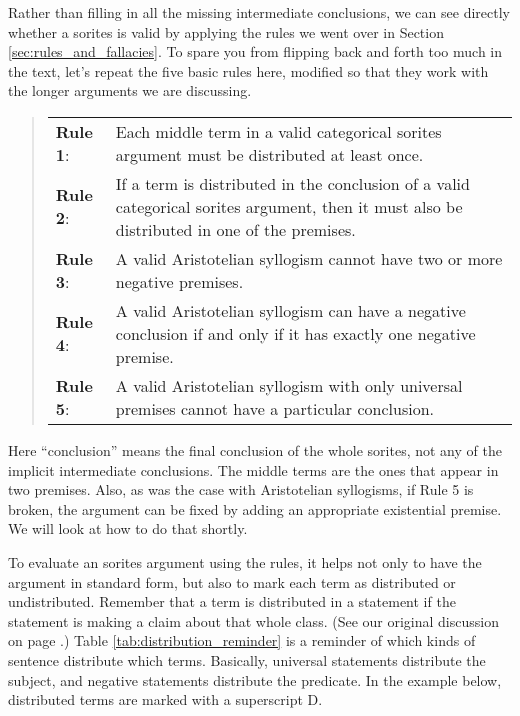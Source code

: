 {Rather than filling in all the missing intermediate conclusions, we can see directly whether a sorites is valid by applying the rules we went over in Section  \ref{sec:rules_and_fallacies}. To spare you from flipping back and forth too much in the text, let's repeat the five basic rules here, modified so that they work with the longer arguments we are discussing. 

\begin{quotation}
\begin{tabu}{p{.1\linewidth}p{.9\linewidth}}
\textbf{Rule 1}: & Each middle term in a valid categorical sorites argument must be distributed at least once. \\
\textbf{Rule 2}: & If a term is distributed in the conclusion of a valid categorical sorites argument, then it must also be distributed in one of the premises. \\ 
\textbf{Rule 3}: & A valid Aristotelian syllogism cannot have two or more negative premises. \\
\textbf{Rule 4}: & A valid Aristotelian syllogism can have a negative conclusion if and only if it has exactly one negative premise.\\
\textbf{Rule 5}: & A valid Aristotelian syllogism with only universal premises cannot have a particular conclusion.
\end{tabu}
\end{quotation}

Here ``conclusion'' means the final conclusion of the whole sorites, not any of the implicit intermediate conclusions. The middle terms are the ones that appear in two premises. Also, as was the case with Aristotelian syllogisms, if Rule 5 is broken, the argument can be fixed by adding an appropriate existential premise. We will look at how to do that shortly. 

To evaluate an sorites argument using the rules, it helps not only to have the argument in standard form, but also to mark each term as distributed or undistributed. Remember that a term is distributed in a statement if the statement is making a claim about that whole class. (See our original discussion on page \pageref{def:Distribution}.) Table \ref{tab:distribution_reminder} is a reminder of which kinds of sentence distribute which terms. Basically, universal statements distribute the subject, and negative statements distribute the predicate. In the example below, distributed terms are marked with a superscript D. 

}
